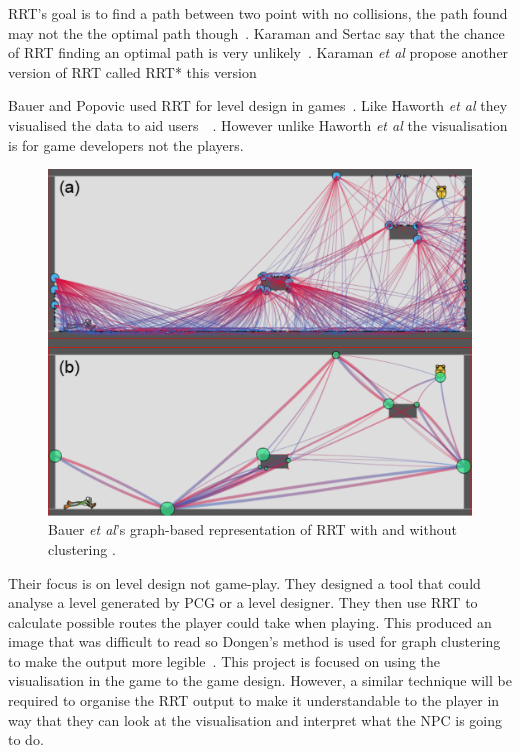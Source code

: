\documentclass[journal]{IEEEtran}
\begin{document}
RRT's goal is to find a path between two point with no collisions, the path found may not the the optimal path though~\cite{Kuffner2000, Karaman2011}.  Karaman and Sertac say that the chance of RRT finding an optimal path is very unlikely~\cite{karaman2010}.  Karaman \textit{et al} propose another version of RRT called RRT* this version 

Bauer and Popovic used RRT for level design in games~\cite{bauer2012}. Like Haworth \textit{et al} they visualised the data to aid users~\cite{bauer2012}~\cite{Haworth2010}. However unlike Haworth \textit{et al} the visualisation is for game developers not the players. 

\begin{figure}[h]
	\includegraphics[width=1.0\linewidth]{BauerRRT.png}
	\caption{ Bauer \textit{et al}'s graph-based representation of RRT with and without clustering \cite{bauer2012}.}
	\label{BauerRRT}
\end{figure} 

Their focus is on level design not game-play. They designed a tool that could analyse a level generated by PCG or a level designer. They then use RRT to calculate possible routes the player could take when playing. This produced an image that was difficult to read so Dongen's method is used for graph clustering to make the output more legible~\cite{bauer2012, van2001}.  This project is focused on using the visualisation in the game to the game design. However, a similar technique will be required to organise the RRT output to make it understandable to the player in way that they can look at the visualisation and interpret what the NPC is going to do. 
\end{document}
